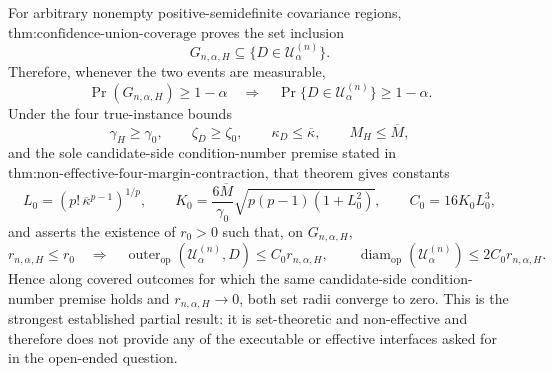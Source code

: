 For arbitrary nonempty positive-semidefinite covariance regions, \(\text{thm:confidence-union-coverage}\) proves the set inclusion
\[
G_{n,\alpha,H}\subseteq\{D\in\mathcal U^{(n)}_\alpha\}.
\]
Therefore, whenever the two events are measurable,
\[
\Pr(G_{n,\alpha,H})\geq 1-\alpha
\quad\Longrightarrow\quad
\Pr\{D\in\mathcal U^{(n)}_\alpha\}\geq 1-\alpha.
\]
Under the four true-instance bounds
\[
\gamma_H\geq\gamma_0,
\qquad
\zeta_D\geq\zeta_0,
\qquad
\kappa_D\leq\overline\kappa,
\qquad
M_H\leq\overline M,
\]
and the sole candidate-side condition-number premise stated in \(\text{thm:non-effective-four-margin-contraction}\), that theorem gives constants
\[
L_0=(p!\,\overline\kappa^{p-1})^{1/p},
\qquad
K_0=\frac{6\overline M}{\gamma_0}
\sqrt{p(p-1)(1+L_0^2)},
\qquad
C_0=16K_0L_0^3,
\]
and asserts the existence of \(r_0>0\) such that, on \(G_{n,\alpha,H}\),
\[
r_{n,\alpha,H}\leq r_0
\quad\Longrightarrow\quad
\operatorname{outer}_{\mathrm{op}}(\mathcal U^{(n)}_\alpha,D)
\leq C_0r_{n,\alpha,H},
\qquad
\operatorname{diam}_{\mathrm{op}}(\mathcal U^{(n)}_\alpha)
\leq 2C_0r_{n,\alpha,H}.
\]
Hence along covered outcomes for which the same candidate-side condition-number premise holds and \(r_{n,\alpha,H}\to0\), both set radii converge to zero. This is the strongest established partial result: it is set-theoretic and non-effective and therefore does not provide any of the executable or effective interfaces asked for in the open-ended question.